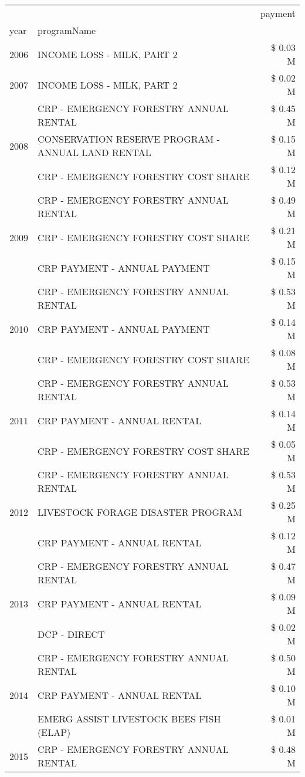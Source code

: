 \begin{tabular}{llr}
\toprule
 &  & payment \\
year & programName &  \\
\midrule
2006 & INCOME LOSS - MILK, PART 2 & \$ 0.03 M \\
\cline{1-3}
2007 & INCOME LOSS - MILK, PART 2 & \$ 0.02 M \\
\cline{1-3}
\multirow[t]{3}{*}{2008} & CRP - EMERGENCY FORESTRY ANNUAL RENTAL & \$ 0.45 M \\
 & CONSERVATION RESERVE PROGRAM - ANNUAL LAND RENTAL & \$ 0.15 M \\
 & CRP - EMERGENCY FORESTRY COST SHARE & \$ 0.12 M \\
\cline{1-3}
\multirow[t]{3}{*}{2009} & CRP - EMERGENCY FORESTRY ANNUAL RENTAL & \$ 0.49 M \\
 & CRP - EMERGENCY FORESTRY COST SHARE & \$ 0.21 M \\
 & CRP PAYMENT - ANNUAL PAYMENT & \$ 0.15 M \\
\cline{1-3}
\multirow[t]{3}{*}{2010} & CRP - EMERGENCY FORESTRY ANNUAL RENTAL & \$ 0.53 M \\
 & CRP PAYMENT - ANNUAL PAYMENT & \$ 0.14 M \\
 & CRP - EMERGENCY FORESTRY COST SHARE & \$ 0.08 M \\
\cline{1-3}
\multirow[t]{3}{*}{2011} & CRP - EMERGENCY FORESTRY ANNUAL RENTAL & \$ 0.53 M \\
 & CRP PAYMENT - ANNUAL RENTAL & \$ 0.14 M \\
 & CRP - EMERGENCY FORESTRY COST SHARE & \$ 0.05 M \\
\cline{1-3}
\multirow[t]{3}{*}{2012} & CRP - EMERGENCY FORESTRY ANNUAL RENTAL & \$ 0.53 M \\
 & LIVESTOCK FORAGE DISASTER PROGRAM & \$ 0.25 M \\
 & CRP PAYMENT - ANNUAL RENTAL & \$ 0.12 M \\
\cline{1-3}
\multirow[t]{3}{*}{2013} & CRP - EMERGENCY FORESTRY ANNUAL RENTAL & \$ 0.47 M \\
 & CRP PAYMENT - ANNUAL RENTAL & \$ 0.09 M \\
 & DCP - DIRECT & \$ 0.02 M \\
\cline{1-3}
\multirow[t]{3}{*}{2014} & CRP - EMERGENCY FORESTRY ANNUAL RENTAL & \$ 0.50 M \\
 & CRP PAYMENT - ANNUAL RENTAL & \$ 0.10 M \\
 & EMERG ASSIST LIVESTOCK BEES FISH (ELAP) & \$ 0.01 M \\
\cline{1-3}
\multirow[t]{3}{*}{2015} & CRP - EMERGENCY FORESTRY ANNUAL RENTAL & \$ 0.48 M \\

\end{tabular}
